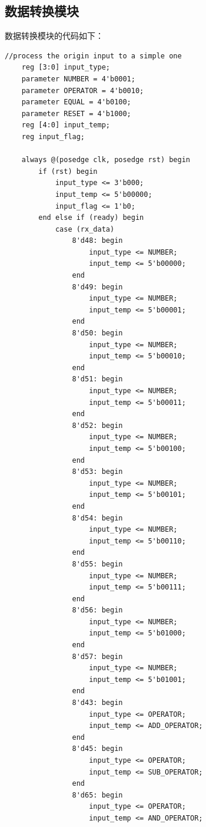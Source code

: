 \documentclass[UTF8]{ctexart}
\begin{document}
\subsection{数据转换模块}
数据转换模块的代码如下：
\begin{framed}
    \begin{lstlisting}[style=verilogStyle]
//process the origin input to a simple one
    reg [3:0] input_type;
    parameter NUMBER = 4'b0001;
    parameter OPERATOR = 4'b0010;
    parameter EQUAL = 4'b0100;
    parameter RESET = 4'b1000;
    reg [4:0] input_temp;
    reg input_flag;

    always @(posedge clk, posedge rst) begin
        if (rst) begin
            input_type <= 3'b000;
            input_temp <= 5'b00000;
            input_flag <= 1'b0;
        end else if (ready) begin
            case (rx_data)
                8'd48: begin
                    input_type <= NUMBER;
                    input_temp <= 5'b00000;
                end
                8'd49: begin
                    input_type <= NUMBER;
                    input_temp <= 5'b00001;
                end
                8'd50: begin
                    input_type <= NUMBER;
                    input_temp <= 5'b00010;
                end
                8'd51: begin
                    input_type <= NUMBER;
                    input_temp <= 5'b00011;
                end
                8'd52: begin
                    input_type <= NUMBER;
                    input_temp <= 5'b00100;
                end
                8'd53: begin
                    input_type <= NUMBER;
                    input_temp <= 5'b00101;
                end
                8'd54: begin
                    input_type <= NUMBER;
                    input_temp <= 5'b00110;
                end
                8'd55: begin
                    input_type <= NUMBER;
                    input_temp <= 5'b00111;
                end
                8'd56: begin
                    input_type <= NUMBER;
                    input_temp <= 5'b01000;
                end
                8'd57: begin
                    input_type <= NUMBER;
                    input_temp <= 5'b01001;
                end
                8'd43: begin
                    input_type <= OPERATOR;
                    input_temp <= ADD_OPERATOR;
                end
                8'd45: begin
                    input_type <= OPERATOR;
                    input_temp <= SUB_OPERATOR;
                end
                8'd65: begin
                    input_type <= OPERATOR;
                    input_temp <= AND_OPERATOR;

\end{lstlisting}
\end{framed}
\end{document}
